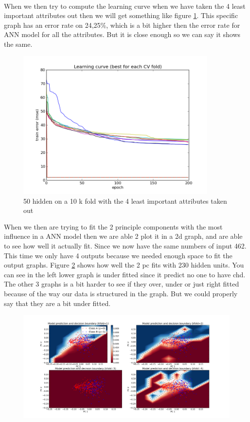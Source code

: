 \documentclass{article}
\begin{document}
\\
When we then try to compute the learning curve when we have taken the 4 least important attributes out then we will get something like figure \ref{notfull_10_25_50}. This specific graph has an error rate on 24,25\%, which is a bit higher then the error rate for ANN model for all the attributes. But it is close enough so we can say it shows the same.
\begin{figure}[!h]
\centering
\includegraphics[width=10cm, keepaspectratio=true]{pictures/figure_1.png}
\vspace{-0.4cm}
\caption{\footnotesize 50 hidden on a 10 k fold with the 4 least important attributes taken out}
\label{notfull_10_25_50}
\end{figure}
\newpage
When we then are trying to fit the 2 principle components with the most influence in a ANN model then we are able 2 plot it in a 2d graph, and are able to see how well it actually fit. Since we now have the same numbers of input 462. This time we only have 4 outputs because we needed enough space to fit the output graphs. Figure \ref{ann} shows how well the 2 pc fits with 230 hidden units. You can see in the left lower graph is under fitted since it predict no one to have chd. The other 3 graphs is a bit harder to see if they over, under or just right fitted because of the way our data is structured in the graph. But we could properly say that they are a bit under fitted.
\begin{figure}[!h]
\centering
\includegraphics[width=15cm, keepaspectratio=true]{pictures/ann_2_4_230.png}
\vspace{-0.4cm}
\caption{\footnotesize }
\label{ann}
\end{figure}
\end{document}
